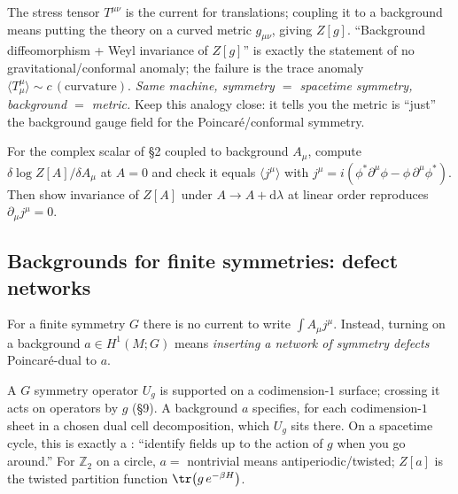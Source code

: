 \documentclass[11pt]{article}
\newcommand{\dd}{\mathrm{d}}                 %
\newcommand{\Ztwo}{\mathbb{Z}_2}
\begin{document}
\begin{eexample}
The stress tensor $T^{\mu\nu}$ is the current for translations; coupling it to a
background means putting the theory on a curved metric $g_{\mu\nu}$, giving $Z[g]$.
``Background diffeomorphism + Weyl invariance of $Z[g]$'' is exactly the statement of no
gravitational/conformal anomaly; the failure is the trace anomaly
$\langle T^\mu_\mu\rangle\sim c\,(\text{curvature})$. \emph{Same machine, symmetry
$=$ spacetime symmetry, background $=$ metric.} Keep this analogy close: it tells you
the metric is ``just'' the background gauge field for the Poincar\'e/conformal symmetry.
\end{eexample}

\begin{xca}
For the complex scalar of \S2 coupled to background $A_\mu$, compute
$\delta \log Z[A]/\delta A_\mu$ at $A=0$ and check it equals $\langle j^\mu\rangle$ with
$j^\mu = i(\phi^*\partial^\mu\phi - \phi\,\partial^\mu\phi^*)$. Then show invariance of
$Z[A]$ under $A\to A+\dd\lambda$ at linear order reproduces $\partial_\mu j^\mu=0$.
\end{xca}

\subsection{Backgrounds for finite symmetries: defect networks}

For a finite symmetry $G$ there is no current to write $\int A_\mu j^\mu$. Instead,
turning on a background $a\in H^1(M;G)$ means \emph{inserting a network of symmetry
defects} Poincar\'e-dual to $a$.

\begin{iintuition}[Background $=$ symmetry-defect network $=$ twisted boundary conditions]
A $G$ symmetry operator $U_g$ is supported on a codimension-$1$ surface; crossing it
acts on operators by $g$ (\S9). A background $a$ specifies, for each codimension-$1$
sheet in a chosen dual cell decomposition, which $U_g$ sits there. On a spacetime cycle,
this is exactly a : ``identify fields up to the action
of $g$ when you go around.'' For $\Ztwo$ on a circle, $a=$ nontrivial means
antiperiodic/twisted; $Z[a]$ is the twisted partition function $\tr\big(g\,e^{-\beta
H}\big)$.
\end{iintuition}
\end{document}
